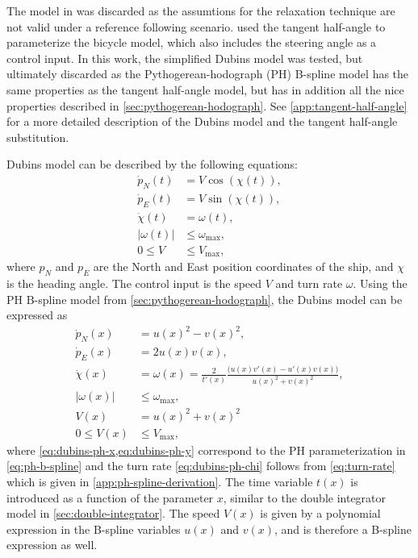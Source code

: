 The model in \cite{Wang2020} was discarded as the assumtions for the relaxation technique are not valid under a reference following scenario. \cite{mercy2017spline} used the tangent half-angle to parameterize the bicycle model, which also includes the steering angle as a control input. In this work, the simplified Dubins model was tested, but ultimately discarded as the Pythogerean-hodograph (PH) B-spline model has the same properties as the tangent half-angle model, but has in addition all the nice properties described in \cref{sec:pythogerean-hodograph}. See \cref{app:tangent-half-angle} for a more detailed description of the Dubins model and the tangent half-angle substitution.

Dubins model can be described by the following equations:
\begin{subequations}\label{eq:dubins-model}
    \begin{align}
        \dot p_N(t) &= V \cos(\chi(t)),       \label{eq:dubins-x} \\
        \dot p_E(t) &= V \sin(\chi(t)),       \label{eq:dubins-y} \\
        \dot \chi(t) &= \omega(t),          \label{eq:dubins-chi} \\
        |\omega(t)| &\leq \omega_{\max}, \label{eq:dubins-omega} \\
        0 \leq V &\leq V_{\max},      \label{eq:dubins-V} 
    \end{align}
\end{subequations}
where $p_N$ and $p_E$ are the North and East position coordinates of the ship, and $\chi$ is the heading angle. The control input is the speed $V$ and turn rate $\omega$. Using the PH B-spline model from \cref{sec:pythogerean-hodograph}, the Dubins model can be expressed as
\begin{subequations}\label{eq:dubins-model-ph}
    \begin{align}
        \dot p_N(x) &= u(x)^2 - v(x)^2, \label{eq:dubins-ph-x} \\
        \dot p_E(x) &= 2u(x)v(x),       \label{eq:dubins-ph-y} \\
        \dot \chi(x) &= \omega(x) 
        = \frac{2}{t'(x)}\frac{\big(u(x)v'(x) - u'(x)v(x)\big)}{u(x)^2 + v(x)^2},  \label{eq:dubins-ph-chi} \\
        |\omega(x)| &\leq \omega_{\max},  \\
        V(x) &= u(x)^2 + v(x)^2 \\
        0 \leq V(x) &\leq V_{\max}, 
    \end{align}
\end{subequations}
where \cref{eq:dubins-ph-x,eq:dubins-ph-y} correspond to the PH parameterization in \cref{eq:ph-b-spline} and the turn rate \cref{eq:dubins-ph-chi} follows from \cref{eq:turn-rate} which is given in \cref{app:ph-spline-derivation}. The time variable $t(x)$ is introduced as a function of the parameter $x$, similar to the double integrator model in \cref{sec:double-integrator}. The speed $V(x)$ is given by a polynomial expression in the B-spline variables $u(x)$ and $v(x)$, and is therefore a B-spline expression as well. 

